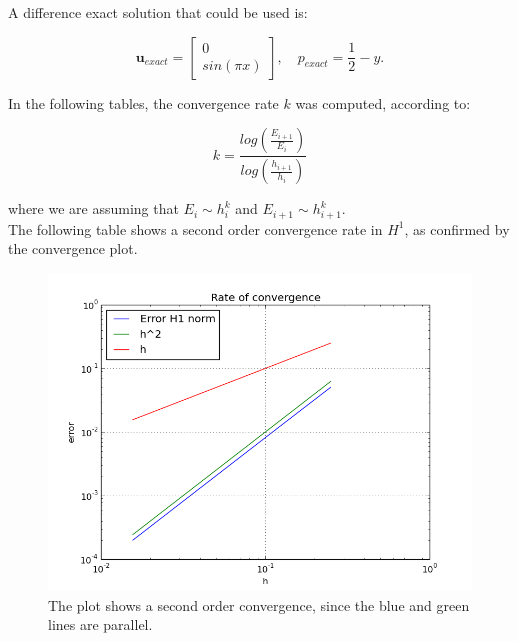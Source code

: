\documentclass[11pt,a4paper,titlepage]{report}
\begin{document}
\vspace{1cm}

A difference exact solution that could be used is:

\[
\mathbf{u}_{exact} = \left[ \begin{array}{c} 0 \\ sin(\pi x) \end{array} \right], \quad
p_{exact} = \frac{1}{2}-y.
\]

In the following tables, the convergence rate $k$ was computed, according to:

\[
k = \frac{log(\frac{E_{i+1}}{E_i})}{log(\frac{h_{i+1}}{h_i})}
\]

where we are assuming that $E_i \sim h^k_i$ and $E_{i+1} \sim h^k_{i+1}$. \\
The following table shows a second order convergence rate in $H^1$, as confirmed by the convergence plot.

\vspace{1cm}
\begin{figure}[h!]
\centering
\includegraphics[width=\textwidth]{images/convergence_sine}
\caption{The plot shows a second order convergence, since the blue and green lines are parallel.}
\end{figure}
\vspace{1cm}
\end{document}

